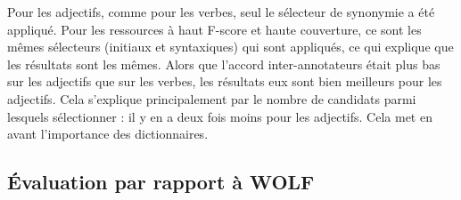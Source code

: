 
Pour les adjectifs, comme pour les verbes, seul le sélecteur de synonymie a été
appliqué. Pour les ressources à haut F-score et haute couverture, ce sont les
mêmes sélecteurs (initiaux et syntaxiques) qui sont appliqués, ce qui explique
que les résultats sont les mêmes. Alors que l'accord inter-annotateurs était
plus bas sur les adjectifs que sur les verbes, les résultats eux sont bien
meilleurs pour les adjectifs. Cela s'explique principalement par le nombre de
candidats parmi lesquels sélectionner : il y en a deux fois moins pour les
adjectifs. Cela met en avant l'importance des dictionnaires.

\subsection{Évaluation par rapport à WOLF}
\label{subsec:vswolf}

